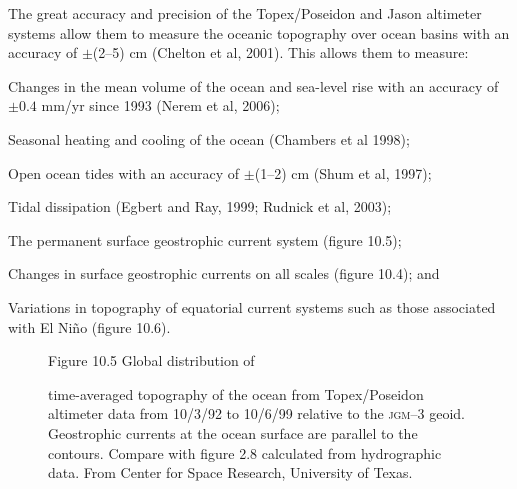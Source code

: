 The great accuracy and precision of the
Topex/Poseidon and
Jason altimeter systems allow them to measure
the oceanic topography over ocean basins with an accuracy of
$\pm$(2--5) cm (Chelton et al, 2001). This allows them to measure:
\begin{enumerate}
\vitem Changes in the mean volume of the ocean and sea-level rise with
an accuracy of $\pm 0.4$ mm/yr since 1993 (Nerem et al, 2006);

\vitem Seasonal heating and cooling of the ocean (Chambers et al 1998);

\vitem Open ocean tides with an accuracy of $\pm$(1--2) cm (Shum et al, 1997);

\vitem Tidal dissipation (Egbert and Ray, 1999; Rudnick et al, 2003);

\vitem The permanent surface geostrophic current system (figure 10.5);

\vitem Changes in surface geostrophic currents on all scales (figure 10.4); and

\vitem Variations in topography of equatorial current systems such as
those associated with El Ni\~{n}o (figure 10.6).
\end{enumerate}

\begin{figure}[t!]
\footnotesize
Figure 10.5 Global distribution of \rule{0pt}{3ex} time-averaged
topography of the ocean from Topex/Pos\-eidon altimeter data from
10/3/92 to 10/6/99 relative to the \textsc{jgm}--3
geoid. Geostrophic cur\-rents at the ocean
surface are parallel to the
contours. Compare with figure 2.8 calculated from hydrographic
data. From Center for Space Research,
University of Texas.
\label{fig:sshmean}
\vspace{-4ex}
\end{figure}

